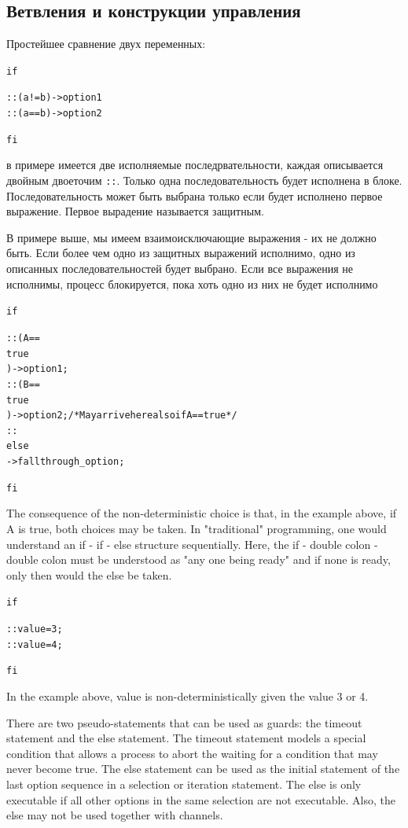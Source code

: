 \documentclass[12pt, twoside]{report}
\newcommand{\cname}[1] {
\textcolor{atnotation}{#1}
}
\begin{document}
\subsection*{Ветвления и конструкции управления}\label{promela_language_IF}

Простейшее сравнение двух переменных:

\begin{alltt}
\cname{if}
:: ( a != b ) -> option1
:: ( a == b ) -> option2
\cname{fi}
\end{alltt}

в примере имеется две исполняемые последрвательности, каждая описывается
двойным двоеточим \texttt{::}. Только одна последовательность будет исполнена
в блоке. Последовательность может быть выбрана только если будет
исполнено первое выражение. Первое вырадение называется защитным.

В примере выше, мы имеем взаимоисключающие выражения - их не должно быть.
Если более чем одно из защитных выражений исполнимо, одно из описанных последовательностей
будет выбрано. Если все выражения не исполнимы, процесс блокируется, пока хоть одно из них не будет исполнимо

\begin{alltt}
\cname{if}
:: (A == \cname{true}) -> option1;
:: (B == \cname{true}) -> option2; /* May arrive here also if A==true */
:: \cname{else} -> fallthrough_option;
\cname{fi}
\end{alltt}
The consequence of the non-deterministic choice is that, in the example above, if A is true,
both choices may be taken. In "traditional" programming, one would understand an
if - if - else structure sequentially. Here, the if - double colon - double colon must be
understood as "any one being ready" and if none is ready, only then would the else be taken.
\begin{alltt}
\cname{if}
:: value = 3;
:: value = 4;
\cname{fi}
\end{alltt}
In the example above, value is non-deterministically given the value 3 or 4.

There are two pseudo-statements that can be used as guards: the timeout statement
and the else statement. The timeout statement models a special condition that allows
a process to abort the waiting for a condition that may never become true. The else
statement can be used as the initial statement of the last option sequence in a selection
or iteration statement. The else is only executable if all other options in the same
 selection are not executable. Also, the else may not be used together with channels.
\end{document}
